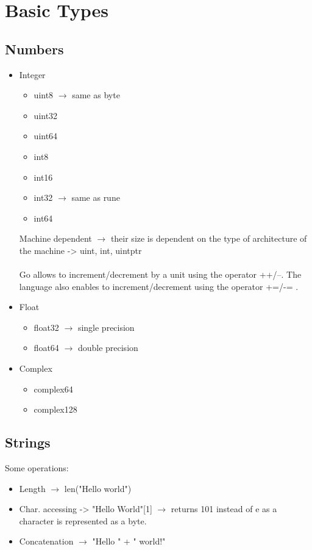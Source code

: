 \documentclass[twoside,a4paper,english]{report}
\begin{document}
\chapter{Basic Types}
\section{Numbers}
\begin{itemize}
\item Integer
\begin{itemize}
\item uint8 $\rightarrow$ same as byte
\item uint32	
\item uint64
\item int8 
\item int16
\item int32 $\rightarrow$ same as rune
\item int64
\end{itemize}
Machine dependent $\rightarrow$ their size is dependent on the type of architecture of the machine -> uint, int, uintptr \\\\
Go allows to increment/decrement by a unit using the operator ++/--. The language also enables to increment/decrement using the operator +=/-= .
\item Float
\begin{itemize}
\item float32 $\rightarrow$ single precision
\item float64 $\rightarrow$ double precision
\end{itemize}
\item Complex
\begin{itemize}
\item complex64
\item complex128
\end{itemize}
\end{itemize}
\section{Strings}
Some operations:
\begin{itemize}
\item Length $\rightarrow$ len("Hello world")
\item Char. accessing -> "Hello World"[1] $\rightarrow$ returns 101 instead of e as a character is represented as a byte.  
\item Concatenation $\rightarrow$ "Hello " + " world!"	
\end{itemize}
\end{document}
